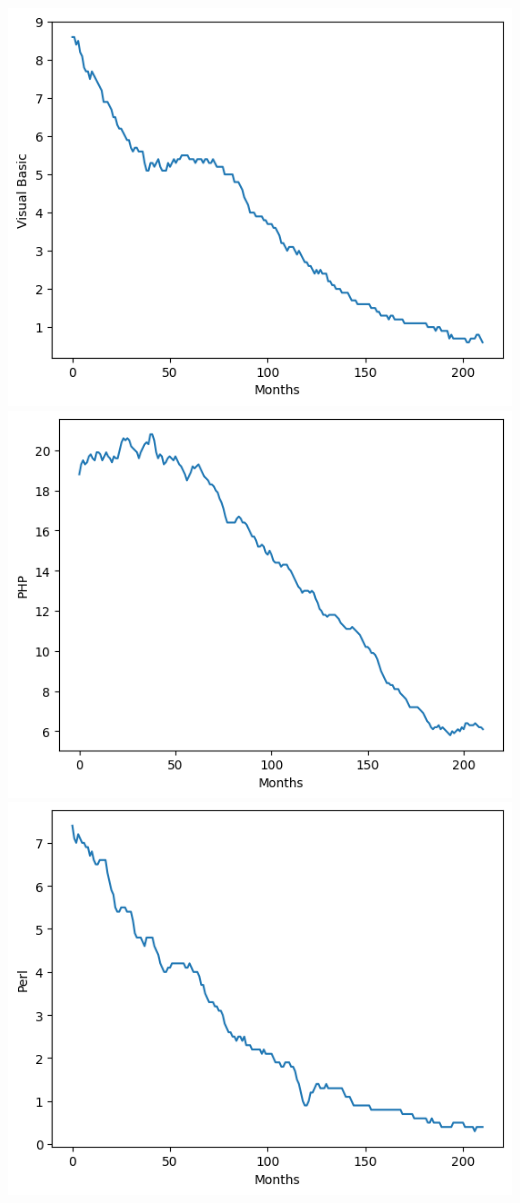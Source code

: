 \documentclass[conference]{IEEEtran}
\begin{document}
\noindent
\includegraphics[scale=0.4]{lineplot/visualbasic.png}
\includegraphics[scale=0.4]{lineplot/php.png}
\includegraphics[scale=0.4]{lineplot/perl.png}
\end{document}
